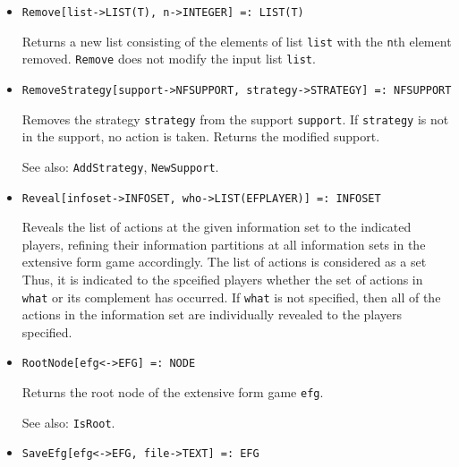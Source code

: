 \begin{itemize}
\item
\protect \large \begin{verbatim}
Remove[list->LIST(T), n->INTEGER] =: LIST(T)
\end{verbatim}\normalsize

\bd
Returns a new list consisting of the elements of list
\verb+list+ with the \verb+n+th element removed.  {\tt Remove} does not
modify the input list \verb+list+.
\ed

\item
\protect \large \begin{verbatim}
RemoveStrategy[support->NFSUPPORT, strategy->STRATEGY] =: NFSUPPORT
\end{verbatim}\normalsize

\bd
Removes the strategy \verb+strategy+ from the
support \verb+support+.  If \verb+strategy+ is not in the support,
no action is taken.  Returns the modified support.
\item
[See also:] {\tt AddStrategy}, {\tt NewSupport}.
\ed

\item
\protect \large \begin{verbatim}
Reveal[infoset->INFOSET, who->LIST(EFPLAYER)] =: INFOSET
\end{verbatim}\normalsize

\bd
Reveals the list of actions at the given information
set to the indicated players, refining their information partitions at
all information sets in the extensive form game accordingly.  The list
of actions is considered as a set Thus, it is indicated to the
spceified players whether the set of actions in \verb+what+ or its
complement has occurred.  If \verb+what+ is not specified, then all of
the actions in the information set are individually revealed to
the players specified.  
\ed


\item
\protect \large \begin{verbatim}
RootNode[efg<->EFG] =: NODE
\end{verbatim}\normalsize

\bd
Returns the root node of the extensive form game \verb+efg+.
\item
[See also:] {\tt IsRoot}.
\ed


\item
\protect \large \begin{verbatim}
SaveEfg[efg<->EFG, file->TEXT] =: EFG
\end{verbatim}\normalsize


\end{itemize}
